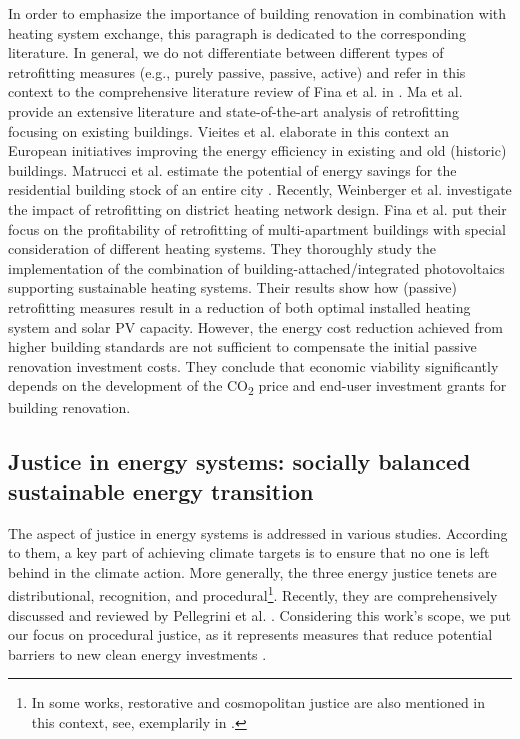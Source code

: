 In order to emphasize the importance of building renovation in combination with heating system exchange, this paragraph is dedicated to the corresponding literature. In general, we do not differentiate between different types of retrofitting measures (e.g., purely passive, passive, active) and refer in this context to the comprehensive literature review of Fina et al. in \cite{fina2019profitability}. Ma et al. \cite{ma2012existing} provide an extensive literature and state-of-the-art analysis of retrofitting focusing on existing buildings. Vieites et al. \cite{vieites2015european} elaborate in this context an European initiatives improving  the energy efficiency in existing and old (historic) buildings. Matrucci et al. estimate the potential of energy savings for the residential building stock of an entire city \cite{mastrucci2014estimating}. Recently, Weinberger et al. \cite{weinberger2021investigating} investigate the impact of retrofitting on district heating network design. Fina et al. \cite{fina2019profitability} put their focus on the profitability of retrofitting of multi-apartment buildings with special consideration of different heating systems. They thoroughly study the implementation of the combination of building-attached/integrated photovoltaics supporting sustainable heating systems. Their results show how (passive) retrofitting measures result in a reduction of both optimal installed heating system and solar PV capacity. However, the energy cost reduction achieved from higher building standards are not sufficient to compensate the initial passive renovation investment costs. They conclude that economic viability significantly depends on the development of the CO\textsubscript{2} price and end-user investment grants for building renovation.

\subsection{Justice in energy systems: socially balanced sustainable energy transition}\label{aspect2}
The aspect of justice in energy systems is addressed in various studies. According to them, a key part of achieving climate targets is to ensure that no one is left behind in the climate action. More generally, the three energy justice tenets are distributional, recognition, and procedural\footnote{In some works, restorative and cosmopolitan justice are also mentioned in this context, see, exemplarily in \cite{oxfordjustice2021}.}. Recently, they are comprehensively discussed and reviewed by Pellegrini et al. \cite{pellegrini2020energy}. Considering this work's scope, we put our focus on procedural justice, as it represents measures that reduce potential barriers to new clean energy investments \cite{oxfordjustice2021}.\vspace{0.5cm}

